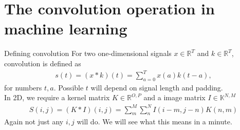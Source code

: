 \documentclass{beamer}
\begin{document}
    \section{The convolution operation in machine learning}

    \begin{frame}{Defining convolution}
        For two one-dimensional signals $x \in \mathbb{R}^T$
        and $k \in \mathbb{R}^T$, convolution is defined as
        \begin{align}
            s(t) = (x * k)(t) = \sum_{a=0}^{T} x(a)k(t - a),
        \end{align}
        for numbers $t,a$. Possible $t$ will depend on signal length and padding. \\
        In 2D, we require a kernel matrix $K \in \mathbb{R}^{O,P}$ and a image matrix
        $I \in \mathbb{K}^{N,M}$
        \begin{align}
            S(i,j) = (K * I)(i,j) = \sum_m^M \sum_n^N I(i-m, j-n)K(n,m)
        \end{align}
        Again not just any $i,j$ will do. We will see what this means in a minute.
    \end{frame}
\end{document}
